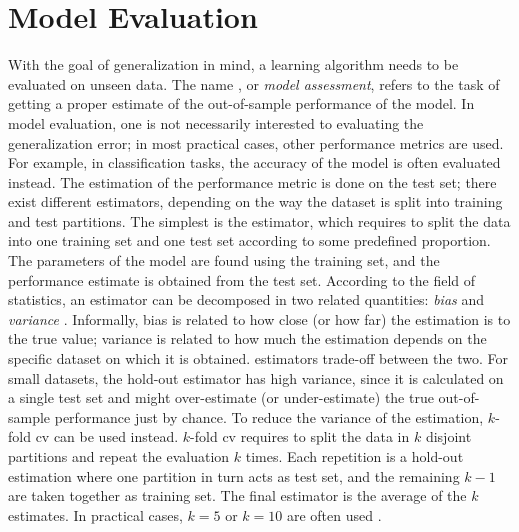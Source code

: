 \section{Model Evaluation}\label{sec:model-selection}
With the goal of generalization in mind, a learning algorithm needs to be evaluated on unseen data. The name , or \emph{model assessment}, refers to the task of getting a proper estimate of the out-of-sample performance of the model. In model evaluation, one is not necessarily interested to evaluating the generalization error; in most practical cases, other performance metrics are used. For example, in classification tasks, the accuracy of the model is often evaluated instead. The estimation of the performance metric is done on the test set; there exist different estimators, depending on the way the dataset is split into training and test partitions. The simplest is the  estimator, which requires to split the data into one training set and one test set according to some predefined proportion. The parameters of the model are found using the training set, and the performance estimate is obtained from the test set. According to the field of statistics, an estimator can be decomposed in two related quantities: \emph{bias} and \emph{variance} \citep{hastie2009elements}. Informally, bias is related to how close (or how far) the estimation is to the true value; variance is related to how much the estimation depends on the specific dataset on which it is obtained.  estimators trade-off between the two. For small datasets, the hold-out estimator has high variance, since it is calculated on a single test set and might over-estimate (or under-estimate) the true out-of-sample performance just by chance. To reduce the variance of the estimation, $k$-fold \gls{cv} \citep{arlot2010cv} can be used instead. $k$-fold \gls{cv} requires to split the data in $k$ disjoint partitions and repeat the evaluation $k$ times. Each repetition is a hold-out estimation where one partition in turn acts as test set, and the remaining $k-1$ are taken together as training set. The final estimator is the average of the $k$ estimates. In practical cases, $k=5$ or $k=10$ are often used \citep{hastie2009elements,kohavi1995kfold}.

